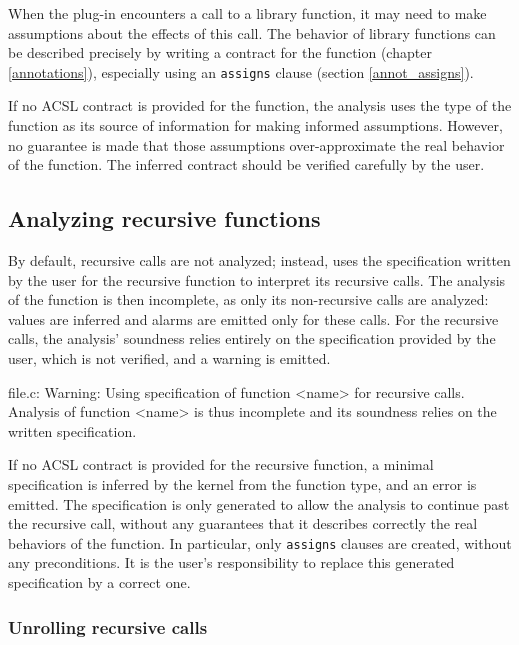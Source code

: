 \documentclass{frama-c-book}
\begin{document}
When the \Eva{} plug-in encounters a call to a library
function, it may need to make assumptions about the effects of this call.
The behavior of library functions can be described precisely
by writing a contract for the function (chapter \ref{annotations}),
especially using an \lstinline|assigns| clause (section \ref{annot_assigns}).

If no ACSL contract is provided for the function, the analysis uses the
type of the function as its source of information for making
informed assumptions. However, no guarantee is made that those assumptions
over-approximate the real behavior of the function. The inferred
contract should be verified carefully by the user.

\subsection{Analyzing recursive functions}
\label{recursion}

By default, recursive calls are not analyzed; instead, \Eva{} uses the
specification written by the user for the recursive function to interpret
its recursive calls. The analysis of the function is then incomplete,
as only its non-recursive calls are analyzed: values are inferred and
alarms are emitted only for these calls.
For the recursive calls, the analysis' soundness relies entirely on the
specification provided by the user, which is not verified, and a warning
is emitted.

\begin{logs}
[eva] file.c: Warning:
  Using specification of function <name> for recursive calls.
  Analysis of function <name> is thus incomplete and its soundness
  relies on the written specification.
\end{logs}

If no ACSL contract is provided for the recursive function,
a minimal specification is inferred by the \FramaC kernel
from the function type, and an error is emitted.
The specification is only generated to allow the analysis to continue
past the recursive call, without any guarantees that it describes correctly
the real behaviors of the function.
In particular, only \lstinline|assigns| clauses are created, without any
preconditions.
It is the user's responsibility to replace this generated specification by
a correct one.

\subsubsection{Unrolling recursive calls}
\end{document}

